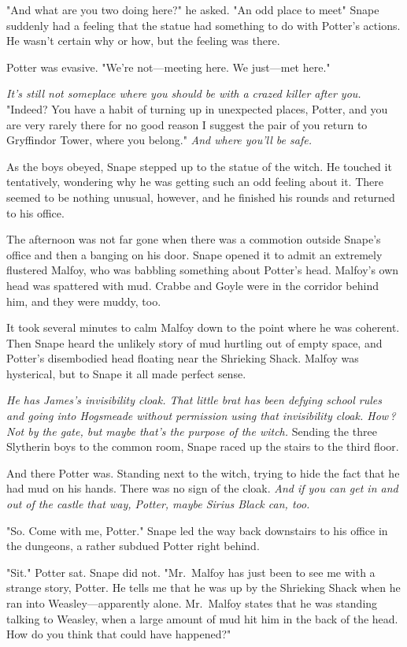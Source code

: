 "And what are you two doing here?" he asked. "An odd place to meet{\el}" Snape suddenly had a feeling that the statue had something to do with Potter's actions. He wasn't certain why or how, but the feeling was there.

Potter was evasive. "We're not—meeting here. We just—met here."

\emph{It's still not someplace where you should be with a crazed killer after you.} "Indeed? You have a habit of turning up in unexpected places, Potter, and you are very rarely there for no good reason{\el} I suggest the pair of you return to Gryffindor Tower, where you belong." \emph{And where you'll be safe.}

As the boys obeyed, Snape stepped up to the statue of the witch. He touched it tentatively, wondering why he was getting such an odd feeling about it. There seemed to be nothing unusual, however, and he finished his rounds and returned to his office.

The afternoon was not far gone when there was a commotion outside Snape's office and then a banging on his door. Snape opened it to admit an extremely flustered Malfoy, who was babbling something about Potter's head. Malfoy's own head was spattered with mud. Crabbe and Goyle were in the corridor behind him, and they were muddy, too.

It took several minutes to calm Malfoy down to the point where he was coherent. Then Snape heard the unlikely story of mud hurtling out of empty space, and Potter's disembodied head floating near the Shrieking Shack. Malfoy was hysterical, but to Snape it all made perfect sense.

\emph{He has James's invisibility cloak. That little brat has been defying school rules and going into Hogsmeade without permission using that invisibility cloak. How{\el}\,? Not by the gate, but maybe that's the purpose of the witch.} Sending the three Slytherin boys to the common room, Snape raced up the stairs to the third floor.

And there Potter was. Standing next to the witch, trying to hide the fact that he had mud on his hands. There was no sign of the cloak. \emph{And if you can get in and out of the castle that way, Potter, maybe Sirius Black can, too.}

"So. Come with me, Potter." Snape led the way back downstairs to his office in the dungeons, a rather subdued Potter right behind.

"Sit." Potter sat. Snape did not. "Mr.~Malfoy has just been to see me with a strange story, Potter. He tells me that he was up by the Shrieking Shack when he ran into Weasley—apparently alone. Mr.~Malfoy states that he was standing talking to Weasley, when a large amount of mud hit him in the back of the head. How do you think that could have happened?"


